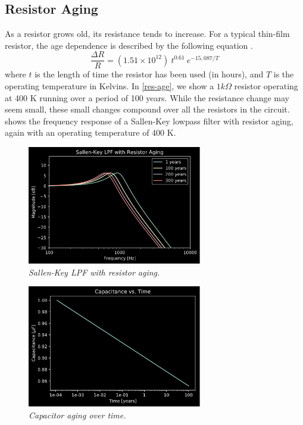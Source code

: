 \documentclass[twoside,a4paper]{article}
\begin{document}
\subsection{Resistor Aging} \label{sec:res-age}
%
As a resistor grows old, its resistance tends to increase. For a typical
thin-film resistor, the age dependence is described by the following
equation \cite{thermal_resistors}.
%
\begin{equation}
    \frac{\Delta R}{R} = (1.51 \times 10^{12})\ 
    t^{0.61}\  e^{- 15,087 / T}    
    \label{eq:resistor-age}
\end{equation}
%
where $t$ is the length of time the resistor has been used (in hours), and
$T$ is the operating temperature in Kelvins. In \cref{res-age}, we show
a $1 k\Omega$ resistor operating at 400 K running over a period of 100
years. While the resistance change may seem small, these small changes
compound over all the resistors in the circuit. \Cref{res-age-freq} shows
the frequency response of a Sallen-Key lowpass filter with resistor aging,
again with an operating temperature of 400 K.
%
\begin{figure}[h]
    \center
    \includegraphics[width=3in]{../CMAging/Pics/r_freq.png}
    \caption{\label{res-age-freq}{\it Sallen-Key LPF with resistor aging.}}
\end{figure}
%
\begin{figure}[h]
    \center
    \includegraphics[width=3in]{../CMAging/Pics/cap_time.png}
    \caption{\label{cap-age}{\it Capacitor aging over time.}}
\end{figure}
\end{document}
